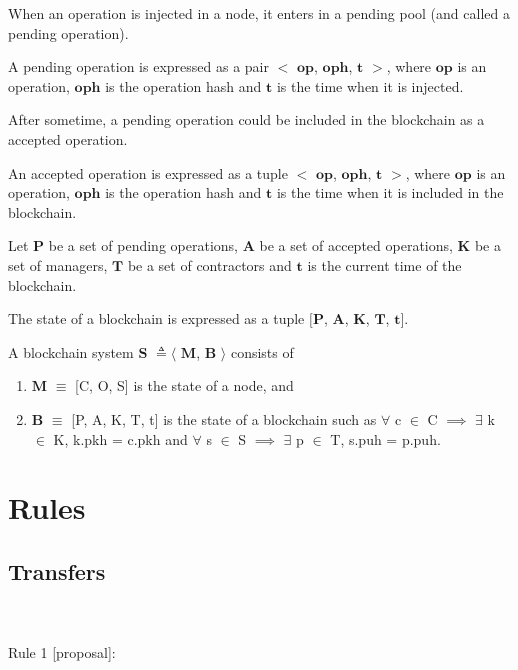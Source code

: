 \documentclass[a4paper]{llncs}
\begin{document}
When an operation is injected in a node, it enters in a pending pool (and called a pending operation). 
 \begin{definition}
A pending operation is expressed as a pair  $<$ $\mathbf{op}$, $\mathbf{oph}$, $\mathbf{t}$ $>$, where $\mathbf{op}$ is an operation, $\mathbf{oph}$ is the operation hash and $\mathbf{t}$ is the time when it is injected. 
\end{definition}
After sometime, a pending operation could be included in the blockchain as a accepted operation.
 \begin{definition}
An accepted operation  is expressed as a tuple $<$ $\mathbf{op}$, $\mathbf{oph}$, $\mathbf{t}$ $>$, where $\mathbf{op}$ is an operation, $\mathbf{oph}$ is the operation hash and $\mathbf{t}$ is the time when it is included in the blockchain. 
\end{definition}
Let $\mathbf{P}$ be a set of pending operations,  $\mathbf{A}$ be a set of accepted operations, $\mathbf{K}$ be a set of managers, $\mathbf{T}$ be a set of contractors %
and $\mathbf{t}$ is the current time of the blockchain. 

\begin{definition}[Blockchain]
The state of a blockchain is expressed as a tuple $[$$\mathbf{P}$, $\mathbf{A}$, $\mathbf{K}$, $\mathbf{T}$, $\mathbf{t}$$]$.  
\end{definition}

\begin{definition}
A blockchain system 
$\mathbf{S}$ $\triangleq\langle$ $\mathbf{M}$, $\mathbf{B}$ $\rangle$ consists of
\begin{enumerate}
\item $\mathbf{M}$ $\equiv$ [C, O, S] is the state of a node, and
\item $\mathbf{B}$ $\equiv$ [P, A, K, T, t] is the state of a blockchain 
such as $\forall$ c $\in$ C $\implies$ $\exists$ k $\in$ K, k.pkh = c.pkh and $\forall$ s $\in$ S $\implies$ $\exists$ p $\in$ T, s.puh = p.puh.
\end{enumerate}
\end{definition}

\section{Rules}
\subsection{Transfers}
\\
\\
Rule 1 [proposal]:
\end{document}
